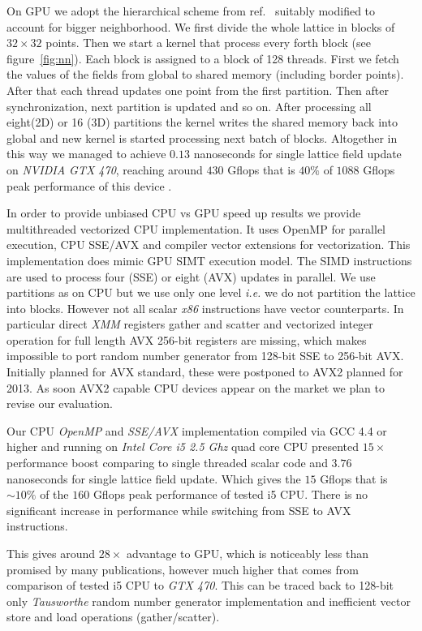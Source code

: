 \documentclass[a4paper]{llncs}
\begin{document}
{%
On GPU we adopt the hierarchical scheme from ref.~\cite{weigel}
suitably modified to account for bigger neighborhood.  We first divide
the whole lattice in blocks of $32\times 32$ points. Then we start a
kernel that process every forth block (see figure~\ref{fig:nn}).  Each
block is assigned to a block of 128 threads. First we fetch the values of the fields from global to shared memory (including border points).  
After that each thread updates
one point from the first partition. Then after synchronization, next
partition is updated and so on. After processing all eight(2D) or 16
(3D) partitions the kernel writes the shared memory back into global
and new kernel is started processing next batch of blocks. 
Altogether in this
way we managed to achieve $0.13$ nanoseconds for single lattice field
update on \emph{NVIDIA GTX 470}, reaching around $430$ Gflops that is
$40\%$ of $1088$ Gflops peak performance of this device .

In order to provide unbiased CPU vs GPU speed up results we provide
multithreaded vectorized CPU implementation. It uses OpenMP for
parallel execution, CPU SSE/AVX and compiler vector extensions for
vectorization.  This implementation does mimic GPU SIMT execution
model.  The SIMD instructions are used to process four (SSE) or eight
(AVX) updates in parallel. We use partitions as on CPU but we use only
one level {\em i.e.} we do not partition the lattice into blocks.
However not all scalar \emph{x86} instructions have vector
counterparts.  In particular direct \emph{XMM} registers gather and
scatter and vectorized integer operation for full length AVX 256-bit
registers are missing, which makes impossible to port random number
generator from 128-bit SSE to 256-bit AVX. Initially planned for AVX
standard, these were postponed to AVX2 planned for 2013. As soon AVX2
capable CPU devices appear on the market we plan to revise our
evaluation.


Our CPU \emph{OpenMP} and \emph{SSE/AVX} implementation compiled via
GCC 4.4 or higher and running on \emph{Intel Core i5 2.5 Ghz} quad
core CPU presented $15\times$ performance boost comparing to single
threaded scalar code and $3.76$ nanoseconds for single lattice field
update.  Which gives the $15$ Gflops that is $\sim10\%$ of the  $160$
Gflops peak performance of tested i5 CPU. There is no significant
increase in performance while switching from SSE to AVX instructions.

This gives around $28\times$ advantage to GPU, which is noticeably
less than promised by many publications, however much higher that
comes from comparison of  tested i5
CPU to \emph{GTX 470}. This can be
traced back to 128-bit only \emph{Tausworthe} random number generator
implementation and inefficient vector store and load operations
(gather/scatter).

}
\end{document}
